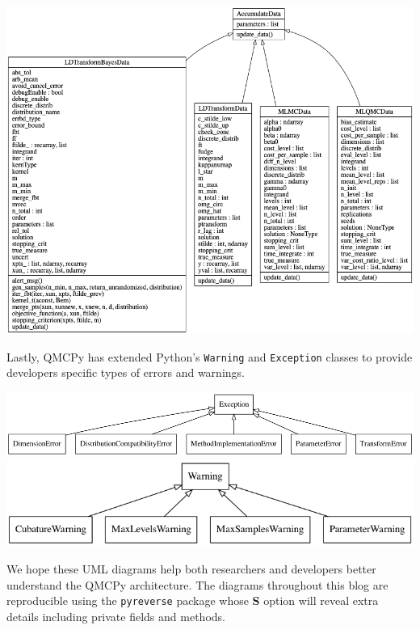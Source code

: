 \begin{center}
\includegraphics[width=1\textwidth]{uml/accumulate_data_blog_uml.png}  
\end{center}



Lastly, QMCPy has extended Python's \texttt{Warning} and \texttt{Exception} classes to provide developers specific types of errors and warnings. 

\begin{center}
\includegraphics[width=1\textwidth]{uml/util_err.png}  
\\ \includegraphics[width=.7\textwidth]{uml/util_warn.png}  
\end{center}

We hope these UML diagrams help both researchers and developers better understand the QMCPy architecture. The diagrams throughout this blog are reproducible using the \texttt{pyreverse} package  whose \textbf{S} option will reveal extra details including private fields and methods.
